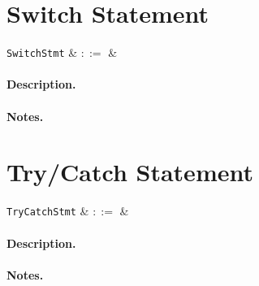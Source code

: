 
\section{Switch Statement}

\begin{syntax}
  \verb+SwitchStmt+ & $::=$ &\\
\end{syntax}

\paragraph{Description.}

\noindent

\paragraph{Notes.} 


\section{Try/Catch Statement}

\begin{syntax}
  \verb+TryCatchStmt+ & $::=$ &\\
\end{syntax}

\paragraph{Description.}

\noindent

\paragraph{Notes.} 
